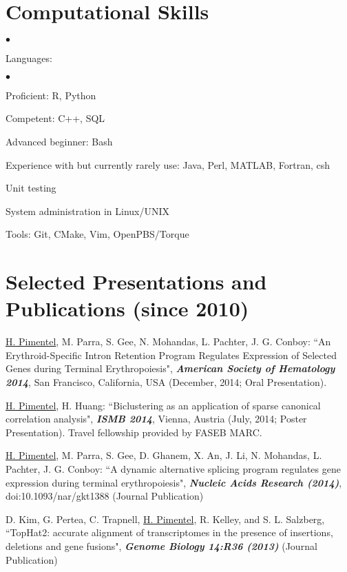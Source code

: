 \documentclass[margin,line]{res}
\newenvironment{list2}{
  \begin{list}{$\bullet$}{%
      \setlength{\itemsep}{0in}
      \setlength{\parsep}{0in} \setlength{\parskip}{0in}
      \setlength{\topsep}{0in} \setlength{\partopsep}{0in}
      \setlength{\leftmargin}{0.2in}}}{\end{list}}
\begin{document}
\begin{resume}
\section{\sc Computational Skills}
\begin{list2}
\item Languages:
  \begin{list2}
    \item Proficient: R, Python
    \item Competent: C++, SQL
    \item Advanced beginner: Bash
    \item Experience with but currently rarely use: Java, Perl, MATLAB, Fortran, csh
  \end{list2}
\item Unit testing
\item System administration in Linux/UNIX
\item Tools: Git, CMake, Vim, OpenPBS/Torque\\
\end{list2}
\vspace{-.65cm}

\section{\sc Selected Presentations and Publications (since 2010)}

\underline{H. Pimentel}, M. Parra, S. Gee, N. Mohandas, L. Pachter, J. G.
Conboy: ``An Erythroid-Specific Intron Retention Program Regulates Expression
of Selected Genes during Terminal Erythropoiesis", {\bf \emph{American Society
    of Hematology 2014}}, San Francisco, California, USA (December, 2014; Oral
Presentation).

\underline{H. Pimentel}, H. Huang: ``Biclustering as an application of sparse
canonical correlation analysis", {\bf \emph{ISMB 2014}}, Vienna, Austria (July,
2014; Poster Presentation). Travel fellowship provided by FASEB MARC.

\underline{H. Pimentel}, M. Parra, S. Gee, D. Ghanem, X. An, J. Li, N.
Mohandas, L. Pachter, J. G. Conboy: ``A dynamic alternative splicing program
regulates gene expression during terminal erythropoiesis", {\bf \emph{Nucleic
    Acids Research (2014)}}, doi:10.1093/nar/gkt1388 (Journal Publication)

D. Kim, G. Pertea, C. Trapnell, \underline{H. Pimentel}, R. Kelley, and S.
L. Salzberg, ``TopHat2: accurate alignment of transcriptomes in the presence of
insertions, deletions and gene fusions", {\bf \emph{Genome Biology
    14:R36 (2013)}} (Journal Publication)


\end{resume}
\end{document}
